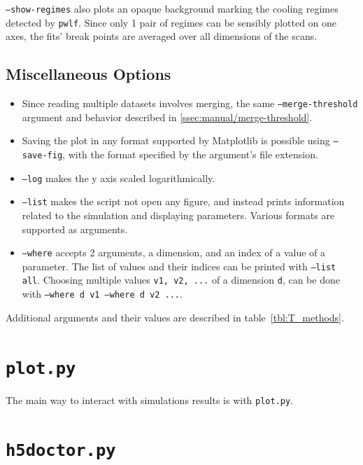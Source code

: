 \texttt{--show-regimes} also plots an opaque background marking the cooling regimes detected by \texttt{pwlf}\cite{pwlf}. Since only 1 pair of regimes can be sensibly plotted on one axes, the fits' break points are averaged over all dimensions of the scans.

\subsection{Miscellaneous Options}

\begin{itemize}
	\item Since reading multiple datasets involves merging, the same \texttt{--merge-threshold} argument and behavior described in \ref{ssec:manual/merge-threshold}.
	\item Saving the plot in any format supported by Matplotlib is possible using \texttt{--save-fig}, with the format specified by the argument's file extension.
	\item \texttt{--log} makes the y axis scaled logarithmically. 
	\item \texttt{--list} makes the script not open any figure, and instead prints information related to the simulation and displaying parameters. Various formats are supported as arguments.
	\item \texttt{--where} accepts 2 arguments, a dimension, and an index of a value of a parameter. The list of values and their indices can be printed with \texttt{--list all}. Choosing multiple values \texttt{v1, v2, ...} of a dimension \texttt{d}, can be done with \texttt{--where d v1 --where d v2 ...}.
\end{itemize}

Additional arguments and their values are described in table~\ref{tbl:T_methods}.

\section{\texttt{plot.py}}\label{sec:manual/plot}

The main way to interact with simulations results is with \texttt{plot.py}.


\section{\texttt{h5doctor.py}}

